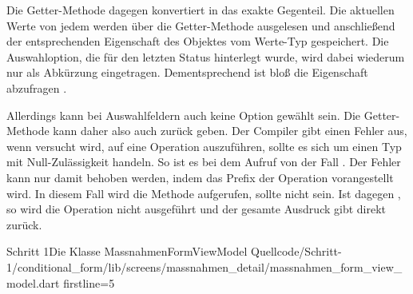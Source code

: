 Die Getter-Methode dagegen konvertiert in das exakte Gegenteil. Die aktuellen Werte von jedem  werden über die Getter-Methode  ausgelesen und anschließend der entsprechenden Eigenschaft des Objektes vom Werte-Typ  gespeichert. Die Auswahloption, die für den letzten Status hinterlegt wurde, wird dabei wiederum nur als Abkürzung eingetragen. Dementsprechend ist bloß die Eigenschaft  abzufragen .  

Allerdings kann bei Auswahlfeldern auch keine Option gewählt sein. Die Getter-Methode  kann daher also auch  zurück geben. Der Compiler gibt einen Fehler aus, wenn versucht wird, auf  eine Operation auszuführen, sollte es sich um einen Typ mit Null-Zulässigkeit handeln. So ist es bei dem Aufruf von  der Fall . Der Fehler kann nur damit behoben werden, indem das Prefix   der Operation vorangestellt wird. In diesem Fall wird die Methode aufgerufen, sollte  nicht  sein. Ist  dagegen , so wird die Operation nicht ausgeführt und der gesamte Ausdruck gibt direkt  zurück. 

\begin{alexlisting}{Schritt 1}{Die Klasse MassnahmenFormViewModel}
  {Quellcode/Schritt-1/conditional_form/lib/screens/massnahmen_detail/massnahmen_form_view_model.dart}
  {firstline=5}
  \label{lst:Schritt1KlasseMassnahmenFormViewModel}
\end{alexlisting}

\clearpage
